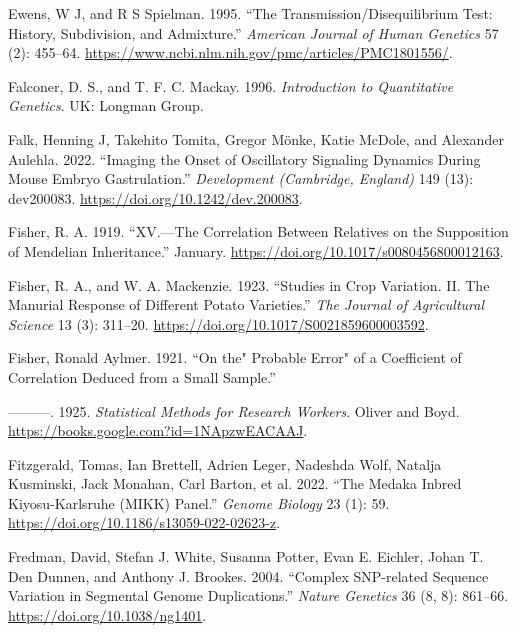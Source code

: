 \documentclass[
]{book}
\newlength{\cslhangindent}
\newlength{\cslentryspacingunit} %
\newenvironment{CSLReferences}[2] %
 {%
  \setlength{\parindent}{0pt}
  \ifodd #1
  \let\oldpar\par
  \def\par{\hangindent=\cslhangindent\oldpar}
  \fi
  \setlength{\parskip}{#2\cslentryspacingunit}
 }%
 {}
\begin{document}
\begin{CSLReferences}{1}{0}
\leavevmode{}%
Ewens, W J, and R S Spielman. 1995. {``The Transmission/Disequilibrium Test: History, Subdivision, and Admixture.''} \emph{American Journal of Human Genetics} 57 (2): 455--64. \url{https://www.ncbi.nlm.nih.gov/pmc/articles/PMC1801556/}.

\leavevmode{}%
Falconer, D. S., and T. F. C. Mackay. 1996. \emph{Introduction to Quantitative Genetics}. {UK: Longman Group}.

\leavevmode{}%
Falk, Henning J, Takehito Tomita, Gregor Mönke, Katie McDole, and Alexander Aulehla. 2022. {``Imaging the Onset of Oscillatory Signaling Dynamics During Mouse Embryo Gastrulation.''} \emph{Development (Cambridge, England)} 149 (13): dev200083. \url{https://doi.org/10.1242/dev.200083}.

\leavevmode{}%
Fisher, R. A. 1919. {``{XV}.---{The Correlation} Between {Relatives} on the {Supposition} of {Mendelian Inheritance}.''} January. \url{https://doi.org/10.1017/s0080456800012163}.

\leavevmode{}%
Fisher, R. A., and W. A. Mackenzie. 1923. {``Studies in Crop Variation. {II}. {The} Manurial Response of Different Potato Varieties.''} \emph{The Journal of Agricultural Science} 13 (3): 311--20. \url{https://doi.org/10.1017/S0021859600003592}.

\leavevmode{}%
Fisher, Ronald Aylmer. 1921. {``On the{"} {Probable Error}{"} of a {Coefficient} of {Correlation Deduced} from a {Small Sample}.''}

\leavevmode{}%
---------. 1925. \emph{Statistical {Methods} for {Research Workers}}. {Oliver and Boyd}. \url{https://books.google.com?id=1NApzwEACAAJ}.

\leavevmode{}%
Fitzgerald, Tomas, Ian Brettell, Adrien Leger, Nadeshda Wolf, Natalja Kusminski, Jack Monahan, Carl Barton, et al. 2022. {``The {Medaka Inbred Kiyosu-Karlsruhe} ({MIKK}) Panel.''} \emph{Genome Biology} 23 (1): 59. \url{https://doi.org/10.1186/s13059-022-02623-z}.

\leavevmode{}%
Fredman, David, Stefan J. White, Susanna Potter, Evan E. Eichler, Johan T. Den Dunnen, and Anthony J. Brookes. 2004. {``Complex {SNP-related} Sequence Variation in Segmental Genome Duplications.''} \emph{Nature Genetics} 36 (8, 8): 861--66. \url{https://doi.org/10.1038/ng1401}.


\end{CSLReferences}
\end{document}

